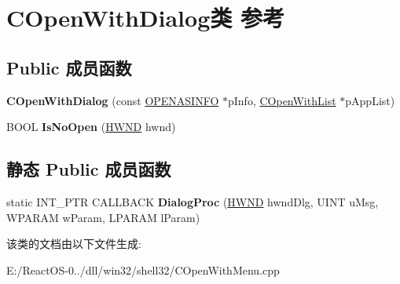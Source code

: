 \hypertarget{class_c_open_with_dialog}{}\section{C\+Open\+With\+Dialog类 参考}
\label{class_c_open_with_dialog}
\subsection*{Public 成员函数}
\begin{DoxyCompactItemize}
\item 
\mbox{\label{class_c_open_with_dialog_ac2422ce2b38a01be7d9783bdfbad108c}} 
{\bfseries C\+Open\+With\+Dialog} (const \hyperlink{structtag_o_p_e_n_a_s_i_n_f_o}{O\+P\+E\+N\+A\+S\+I\+N\+FO} $\ast$p\+Info, \hyperlink{class_c_open_with_list}{C\+Open\+With\+List} $\ast$p\+App\+List)
\item 
\mbox{\label{class_c_open_with_dialog_aaec50ef6fed7a965671563bbb467ceb0}} 
B\+O\+OL {\bfseries Is\+No\+Open} (\hyperlink{interfacevoid}{H\+W\+ND} hwnd)
\end{DoxyCompactItemize}
\subsection*{静态 Public 成员函数}
\begin{DoxyCompactItemize}
\item 
\mbox{\label{class_c_open_with_dialog_adb4a55392d82ae050537e6719bc57a64}} 
static I\+N\+T\+\_\+\+P\+TR C\+A\+L\+L\+B\+A\+CK {\bfseries Dialog\+Proc} (\hyperlink{interfacevoid}{H\+W\+ND} hwnd\+Dlg, U\+I\+NT u\+Msg, W\+P\+A\+R\+AM w\+Param, L\+P\+A\+R\+AM l\+Param)
\end{DoxyCompactItemize}


该类的文档由以下文件生成\+:\begin{DoxyCompactItemize}
\item 
E\+:/\+React\+O\+S-\/0../dll/win32/shell32/C\+Open\+With\+Menu.\+cpp\end{DoxyCompactItemize}
